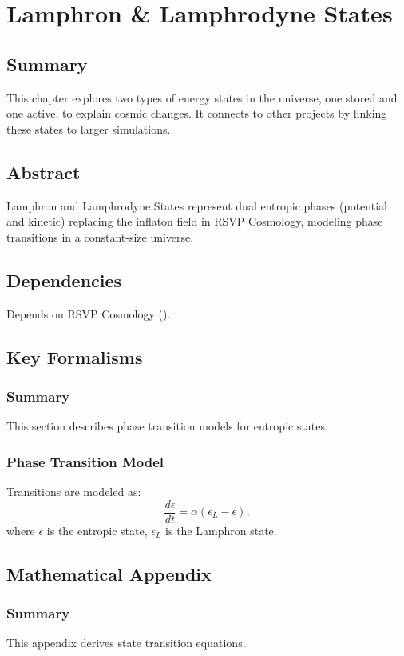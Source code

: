 \documentclass[11pt,oneside]{memoir}
\theoremstyle{plain}
\begin{document}
\chapter{Lamphron \& Lamphrodyne States}
\label{sec:lamphron_lamphrodyne}

\section{Summary}
This chapter explores two types of energy states in the universe, one stored and one active, to explain cosmic changes. It connects to other projects by linking these states to larger simulations.

\section{Abstract}
Lamphron and Lamphrodyne States represent dual entropic phases (potential and kinetic) replacing the inflaton field in RSVP Cosmology, modeling phase transitions in a constant-size universe.

\section{Dependencies}
Depends on RSVP Cosmology ().

\section{Key Formalisms}
\subsection{Summary}
This section describes phase transition models for entropic states.

\subsection{Phase Transition Model}
Transitions are modeled as:
\begin{equation}
    \frac{d\epsilon}{dt} = \alpha (\epsilon_L - \epsilon),
\end{equation}
where \(\epsilon\) is the entropic state, \(\epsilon_L\) is the Lamphron state.

\section{Mathematical Appendix}
\subsection{Summary}
This appendix derives state transition equations.
\end{document}

